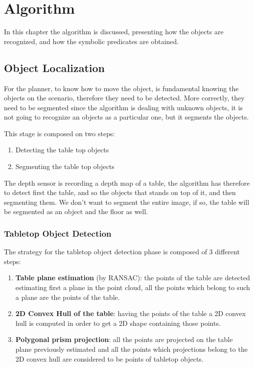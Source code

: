 \chapter{Algorithm}
\label{ch:algorithm}

In this chapter the algorithm is discussed, presenting how the objects are recognized, and how the symbolic predicates are obtained. 

\section{Object Localization} 
For the planner, to know how to move the object, is fundamental knowing the objects on the scenario, therefore they need to be detected. More correctly, they need to be segmented since the algorithm is dealing with unknown objects, it is not going to recognize an objects as a particular one, but it segments the objects. 

This stage is composed on two steps:
\begin{enumerate}
\item Detecting the table top objects
\item Segmenting the table top objects
\end{enumerate}
The depth sensor is recording a depth map of a table, the algorithm has therefore to detect first the table, and so the objects that stands on top of it, and then segmenting them. We don't want to segment the entire image, if so, the table will be segmented as an object and the floor as well.

\subsection{Tabletop Object Detection} 
The strategy for the tabletop object detection phase is composed of 3 different steps:
\begin{enumerate}
\item \textbf{Table plane estimation} (by RANSAC): the points of the table are detected estimating first a plane in the point cloud, all the points which belong to such a plane are the points of the table. 
\item \textbf{2D Convex Hull of the table}: having the points of the table a 2D convex hull is computed in order to get a 2D shape containing those points.
\item \textbf{Polygonal prism projection}: all the points are projected on the table plane previously estimated and all the points which projections belong to the 2D convex hull are considered to be points of tabletop objects. 
\end{enumerate}

